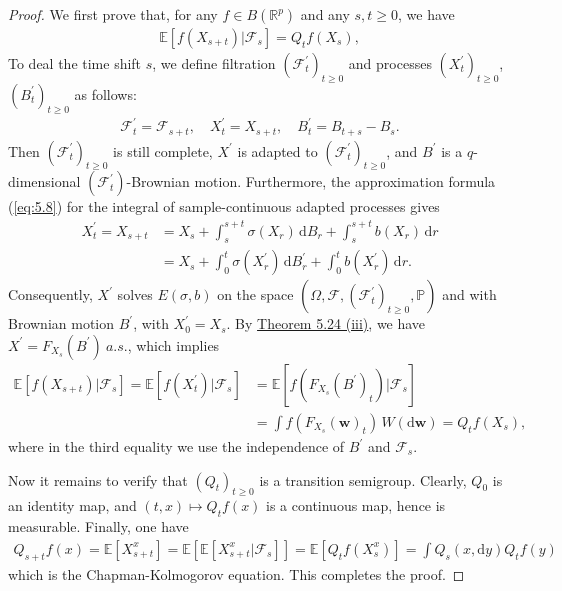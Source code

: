\documentclass{article}
\numberwithin{equation}{section}
\newcommand{\E}{\mathbb{E}}
\newcommand{\bfw}{\mathbf{w}}
\renewcommand{\P}{\mathbb{P}}
\renewcommand{\d}{\mathrm{d}}
\theoremstyle{plain}
\theoremstyle{definition}
\begin{document}
\begin{proof}
We first prove that, for any $f\in B(\mathbb{R}^p)$ and any $s,t\geq 0$, we have
\begin{align*}
	\E\left[f(X_{s+t})|\mathscr{F}_s\right]=Q_tf(X_s),
\end{align*}
To deal the time shift $s$, we define filtration $(\mathscr{F}^\prime_t)_{t\geq 0}$ and processes $(X_t^\prime)_{t\geq 0}$, $(B^\prime_t)_{t\geq 0}$ as follows:
\begin{align*}
	\mathscr{F}^\prime_t = \mathscr{F}_{s+t},\quad X_t^\prime = X_{s+t},\quad B_t^\prime=B_{t+s}-B_s.
\end{align*}
Then $(\mathscr{F}^\prime_t)_{t\geq 0}$ is still complete, $X^\prime$ is adapted to $(\mathscr{F}^\prime_t)_{t\geq 0}$, and $B^\prime$ is a $q$-dimensional $(\mathscr{F}^\prime_t)$-Brownian motion. Furthermore, the approximation formula (\ref{eq:5.8}) for the integral of sample-continuous adapted processes gives
\begin{align*}
	X_t^\prime = X_{s+t} &= X_s + \int_s^{s+t}\sigma(X_r)\,\d B_r + \int_s^{s+t}b(X_r)\,\d r\\
	&= X_s+\int_0^t\sigma(X_r^\prime)\,\d B^\prime_r + \int_0^t b(X_r^\prime)\,\d r.
\end{align*}
Consequently, $X^\prime$ solves $E(\sigma,b)$ on the space $(\Omega,\mathscr{F},(\mathscr{F}_t^\prime)_{t\geq 0},\P)$ and with Brownian motion $B^\prime$, with $X_0^\prime=X_s$. By \hyperref[thm:5.24]{Theorem 5.24 (iii)}, we have $X^\prime=F_{X_s}(B^\prime)\ a.s.$, which implies
\begin{align*}
	\E\left[f(X_{s+t})|\mathscr{F}_s\right]=\E\left[f(X^\prime_t)|\mathscr{F}_s\right] &= \E\left[f(F_{X_s}(B^\prime)_t)|\mathscr{F}_s\right] \\
	&= \int f(F_{X_s}(\bfw)_t)\,W(\d\bfw) = Q_tf(X_s),
\end{align*}
where in the third equality we use the independence of $B^\prime$ and $\mathscr{F}_s$. 

Now it remains to verify that $(Q_t)_{t\geq 0}$ is a transition semigroup. Clearly, $Q_0$ is an identity map, and $(t,x)\mapsto Q_tf(x)$ is a continuous map, hence is measurable. Finally, one have
\begin{align*}
	Q_{s+t}f(x)=\E\left[X_{s+t}^x\right]=\E\left[\E\left[X_{s+t}^x|\mathscr{F}_s\right]\right]= \E\left[Q_tf(X_s^x)\right]=\int Q_s(x,\d y)Q_tf(y)
\end{align*}
which is the Chapman-Kolmogorov equation. This completes the proof.
\end{proof}
\end{document}

